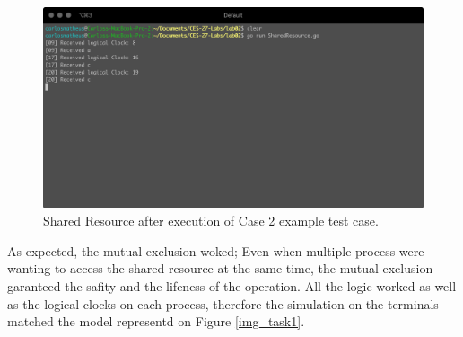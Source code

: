 \documentclass[a4paper, 11pt]{article}
\begin{document}
\begin{figure}[h]
  \begin{center}
  \includegraphics[width=4.5in]{./imgs/case2CS.png}
  \caption{Shared Resource after execution of Case 2 example test case.}
  \label{img_task2_example_window6}
  \end{center}
\end{figure}

As expected, the mutual exclusion woked; Even when multiple process were wanting to access the shared resource at the same time, the mutual exclusion garanteed the safity and the lifeness of the operation. All the logic worked as well as the logical clocks on each process, therefore the simulation on the terminals matched the model representd on Figure \ref{img_task1}.
\end{document}
